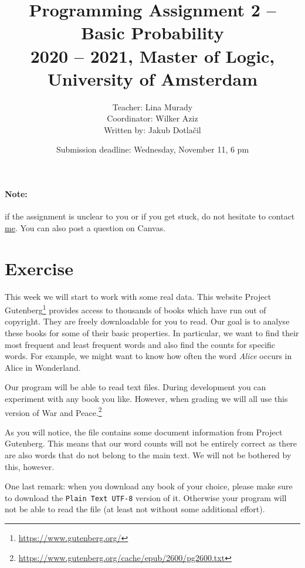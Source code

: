 \documentclass[11pt, a4paper]{article}
\title{Programming Assignment 2 -- Basic Probability \\[2mm]
\large{2020 -- 2021, Master of Logic, University of Amsterdam}}
\author{Teacher: Lina Murady \\
  Coordinator: Wilker Aziz \\
  Written by: Jakub Dotla\v{c}il}
\date{Submission deadline: Wednesday, November 11, 6 pm}
\newcommand{\link}[1]{\footnote{\color{blue}\href{#1}{#1}}}
\begin{document}
\maketitle

\paragraph{Note:} if the assignment is unclear to you or if you get stuck, do not hesitate to contact \href{mailto:l.murady@uva.nl}{me}. You can also post a question on Canvas.

\section{Exercise}
This week we will start to work with some real data. This website Project Gutenberg\link{https://www.gutenberg.org/} provides access to thousands of
books which have run out of copyright. They are freely downloadable for you to read. Our goal is to analyse these books for some of their basic 
properties. In particular, we want to find their most frequent and least frequent words and also find the counts for specific words. For example,
we might want to know how often the word \textit{Alice} occurs in Alice in Wonderland.

Our program will be able to read text files. During development you can experiment
with any book you like. However, when grading we will all use this version of War and Peace.\link{https://www.gutenberg.org/cache/epub/2600/pg2600.txt}

As you will notice, the file contains some document information from Project Gutenberg. This means that our word counts will not be entirely correct as
there are also words that do not belong to the main text. We will not be bothered by this, however.

One last remark: when you download any book of your choice, please make sure to download the \texttt{Plain Text UTF-8} version of it. Otherwise your
program will not be able to read the file (at least not without some additional effort).
\end{document}
